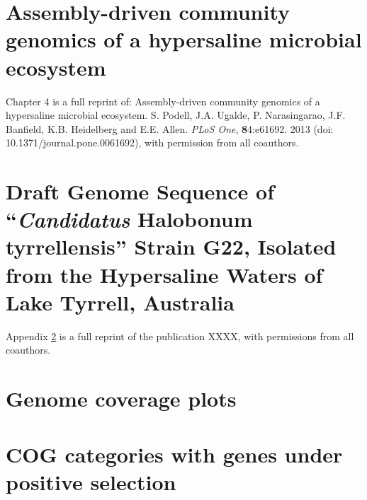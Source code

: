 \documentclass[12pt,chapterheads]{ucsd}
\begin{document}
\chapter{Assembly-driven community genomics of a hypersaline microbial ecosystem}

Chapter 4 is a full reprint of: Assembly-driven community genomics of a hypersaline microbial ecosystem. S. Podell, J.A. Ugalde, P. Narasingarao, J.F. Banfield, K.B. Heidelberg and E.E. Allen. \textit{PLoS One}, \textbf{8}4:e61692. 2013 (doi: 10.1371/journal.pone.0061692), with permission from all coauthors.



%






\appendix

\chapter{Draft Genome Sequence of “\textit{Candidatus} Halobonum tyrrellensis” Strain G22, Isolated from the Hypersaline Waters of Lake Tyrrell, Australia}\label{G22Genome}

Appendix \ref{G22Genome} is a full reprint of the publication XXXX, with permissions from all coauthors.

\chapter{Genome coverage plots}\label{AppendixCoverage}


\chapter{COG categories with genes under positive selection}


%

\listoftodos


\end{document}
